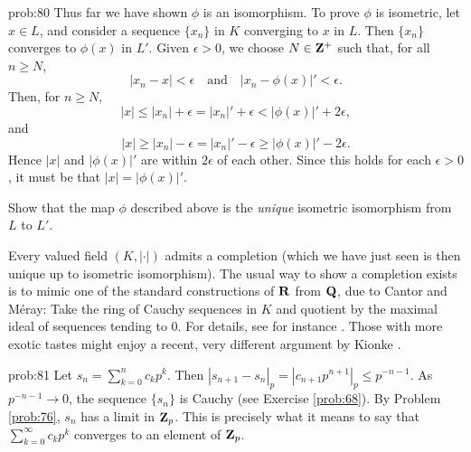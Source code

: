 \begin{sol}{prob:80}
Thus far we have shown $\phi$ is an isomorphism. To prove $\phi$ is isometric, let $x \in L$, and consider a sequence $\{x_n\}$ in $K$ converging to $x$ in $L$. Then $\{x_n\}$ converges to $\phi(x)$ in $L'$. Given $\epsilon > 0$, we choose $N \in \mathbf{Z}^{+}$ such that, for all $n\ge N$,
\[ |x_n-x| < \epsilon\quad\text{and}\quad|x_n-\phi(x)|' < \epsilon. \]
Then, for $n\ge N$,
\[ |x| \le |x_n| + \epsilon = |x_n|' + \epsilon < |\phi(x)|' + 2\epsilon, \]
and
\[ |x| \ge |x_n|-\epsilon = |x_n|'-\epsilon \ge |\phi(x)|'-2\epsilon. \]
Hence $|x|$ and $|\phi(x)|'$ are within $2\epsilon$ of each other. Since this holds for each $\epsilon > 0$, it must be that $|x| = |\phi(x)|'$.
\end{sol}

\begin{challenge} Show that the map $\phi$ described above is the \emph{unique} isometric isomorphism from $L$ to $L'$.
\end{challenge}

\begin{rmk} Every valued field $(K,|\cdot|)$ admits a completion (which we have just seen is then unique up to isometric isomorphism). The usual way to show a completion exists is to mimic one of the standard constructions of $\mathbf{R}$ from $\mathbf{Q}$, due to Cantor and M\'eray: Take the ring of Cauchy sequences in $K$ and quotient by the maximal ideal of sequences tending to $0$. For details, see for instance \cite[\S1.3]{katok}. Those with more exotic tastes might enjoy a recent, very different argument by Kionke \cite{kionke}.
\end{rmk}



\begin{sol}{prob:81} Let $s_n = \sum_{k=0}^{n} c_k p^k$. Then $|s_{n+1}-s_n|_p = |c_{n+1} p^{n+1}|_p \le p^{-n-1}$. As $p^{-n-1}\to 0$, the sequence $\{s_n\}$ is Cauchy (see Exercise \ref{prob:68}). By Problem \ref{prob:76}, $s_n$ has a limit in $\mathbf{Z}_p$. This is precisely what it means to say that $\sum_{k=0}^{\infty} c_k p^k$ converges to an element of $\mathbf{Z}_p$.
\end{sol}

